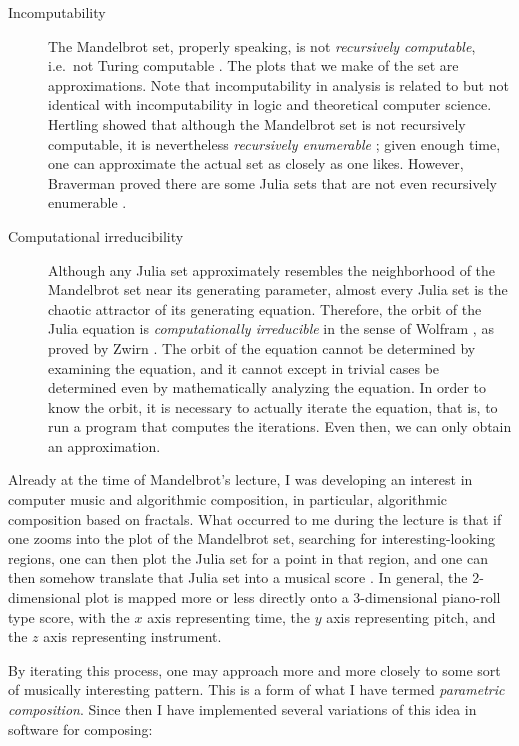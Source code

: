 \documentclass[11pt]{scrartcl}
\begin{document}
\begin{description}
\item[Incomputability] The Mandelbrot set, properly speaking, is not \emph{recursively computable}, i.e.\ not Turing computable \parencite{blum1993godel}. The plots that we make of the set are approximations. Note that incomputability in analysis is related to but not identical with incomputability in logic and theoretical computer science. Hertling showed that although the  Mandelbrot set is not recursively computable, it is nevertheless \emph{recursively enumerable} \parencite{Hertling2005-HERITM-3}; given enough time, one can approximate the actual set as closely as one likes. However, Braverman proved there are some Julia sets that are not even recursively enumerable \parencite{braverman2006non, braverman2009computability}.
\item[Computational irreducibility] Although any Julia set approximately resembles the neighborhood of the Mandelbrot set near its generating parameter, almost every Julia set is the chaotic attractor of its generating equation. Therefore, the orbit of the Julia equation is \emph{computationally irreducible} in the sense of Wolfram \parencite{wolfram1985undecidability}, as proved by Zwirn \parencite{zwirn2015computational}. The orbit of the equation cannot be determined by examining the equation, and it cannot except in trivial cases be determined even by mathematically analyzing the equation. In order to know the orbit, it is necessary to actually iterate the equation, that is, to run a program that computes the iterations. Even then, we can only obtain an approximation.
\end{description}

Already at the time of Mandelbrot's lecture, I was developing an interest in computer music and algorithmic composition, in particular, algorithmic composition based on fractals. What occurred to me during the lecture is that if one zooms into the plot of the Mandelbrot set, searching for interesting-looking regions, one can then plot the Julia set for a point in that region, and one can then somehow translate that Julia set into a musical score \parencite{obsessed}. In general, the 2-dimensional plot is mapped more or less directly onto a 3-dimensional piano-roll type score, with the $x$ axis representing time, the $y$ axis representing pitch, and the $z$ axis representing instrument.

By iterating this process, one may approach more and more closely to some sort of musically interesting pattern. This is a form of what I have termed \emph{parametric composition}. Since then I have implemented several variations of this idea in software for composing:
\end{document}
